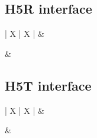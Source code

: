 \subsection{H5R interface}

\begin{tabularx}{\linewidth}{| X | X |}
\hline
 &  \\ \hline

& \\ \hline

\end{tabularx}

\subsection{H5T interface}

\begin{tabularx}{\linewidth}{| X | X |}
\hline
 &  \\ \hline

& \\ \hline

\end{tabularx}

